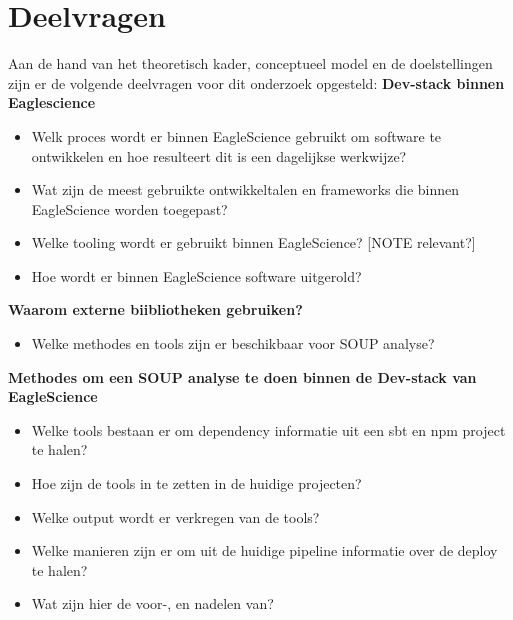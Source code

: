 \section{Deelvragen}\label{sec:deelvragen}
Aan de hand van het theoretisch kader, conceptueel model en de doelstellingen zijn er de volgende deelvragen voor dit onderzoek opgesteld:
\textbf{Dev-stack binnen Eaglescience}
\begin{itemize}
    \item Welk proces wordt er binnen EagleScience gebruikt om software te ontwikkelen en hoe resulteert dit is een dagelijkse werkwijze?
    \item Wat zijn de meest gebruikte ontwikkeltalen en frameworks die binnen EagleScience worden toegepast?
    \item Welke tooling wordt er gebruikt binnen EagleScience? [NOTE relevant?]
    \item Hoe wordt er binnen EagleScience software uitgerold?
\end{itemize}
\textbf{Waarom externe biibliotheken gebruiken?}
\begin{itemize}
    \item Welke methodes en tools zijn er beschikbaar voor SOUP analyse?
\end{itemize}
\textbf{Methodes om een SOUP analyse te doen binnen de Dev-stack van EagleScience}
\begin{itemize}
    \item Welke tools bestaan er om dependency informatie uit een sbt en npm project te halen?
    \item Hoe zijn de tools in te zetten in de huidige projecten?
    \item Welke output wordt er verkregen van de tools?
    \item Welke manieren zijn er om uit de huidige pipeline informatie over de deploy te halen?
    \item Wat zijn hier de voor-, en nadelen van?
\end{itemize}


